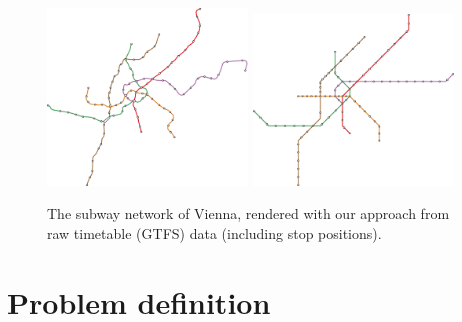 \documentclass{sig-alternate-sigmod09}
\begin{document}
\begin{figure}[t]
  \centering
	\includegraphics[width=0.474\textwidth]{figures/octi_input.pdf}
	\includegraphics[width=0.474\textwidth]{figures/octi.pdf}
	\caption{The subway network of Vienna, rendered with our approach from raw timetable (GTFS) data (including stop positions).}
	\label{FIG:examplewien}
\end{figure}

\section{Problem definition}
\end{document}
